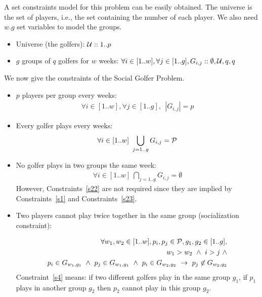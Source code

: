 \documentclass[3p,authoryear,times]{elsarticle}
\newcommand{\card}[1]{|#1|}
\begin{document}
A set constraints model for this problem can be easily obtained.
The universe  is the set of players, i.e., the set containing the number of each player.
We also need $w.g$ set variables to model the  groups.

\begin{itemize}
\item Universe (the golfers): ${\cal U}::1..p$
\item $g$ groups of $q$ golfers for $w$ weeks: $\forall i \in [1.. w],\forall j \in [1..g], G_{i,j}::\emptyset,{\cal U},q,q$
\end{itemize}


We now give the constraints of the Social Golfer Problem.

\begin{itemize}
\item $p$ players per group every weeks:
\begin{eqnarray}
\forall i \in [1..w], \forall j \in [1..g], ~~ \card{G_{i,j}}=p \label{s1}
\end{eqnarray}

\item Every golfer plays every weeks:
\begin{eqnarray}
\forall i \in [1..w]~  \bigcup_{j=1..g} G_{i,j} = {\cal P} \label{s23}
\end{eqnarray}


\item No golfer plays in two groups the same week:
\begin{eqnarray}
\forall i \in [1..w]~ \bigcap_{j=1..g} G_{i,j} = \emptyset \label{s22}
\end{eqnarray}
However, Constraints~\ref{s22}  are not required since they are implied by Constraints~\ref{s1} and Constraints~\ref{s23}.

\item Two players cannot play twice together in the same group ({socialization constraint}):


\begin{eqnarray}
\forall w_1, w_2 \in [1..w], p_i, p_j \in {\cal P}, 
g_1, g_2 \in [1..g],  \notag \\
w_1 > w_2 ~\wedge~ i > j ~\wedge  \label{s4} \\
p_i \in G_{w_1,g_1} ~\wedge~ p_j \in G_{w_1,g_1} ~\wedge~ p_i \in G_{w_2,g_2}
~\rightarrow~ 
p_j \not \in G_{w_2,g_2}\notag
\end{eqnarray}
Constraint~\ref{s4} means: if two different golfers play in the same group $g_1$, if $p_1$ plays in another group $g_2$ then $p_2$ cannot play in this group $g_2$. 


\end{itemize}
\end{document}
